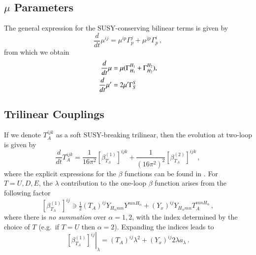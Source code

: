 \documentclass[final,3p,times,pdflatex]{elsarticle}
\newcommand{\dt}{\frac{d}{dt}}
\begin{document}
\subsection{$\mu$ Parameters}
The general expression \cite{MV94,Yam94} for the SUSY-conserving bilinear terms is given by  
%
\begin{equation}
\dt \mu^{ij} = \mu^{ip}\Gamma_p^j + \mu^{jp}\Gamma_p^i\,,
\end{equation}
%
from which we obtain
%
\begin{align}
\dt\mu &= \mu (\Gamma_{H_1}^{H_1} + \Gamma_{H_2}^{H_2}), \notag \\
%
\dt\mu' &= 2\mu' \Gamma_S^S
\end{align}
%

\subsection{Trilinear Couplings}
If we denote $T_A^{ijk}$ as a soft SUSY-breaking trilinear, then the evolution at two-loop is given by 
%
\begin{equation}
\dt T_A^{ijk} = \frac{1}{16\pi^2} \left[\beta_{T_A}^{(1)}\right]^{ijk} 
+ \frac{1}{(16\pi^2)^2} \left[\beta_{T_A}^{(2)}\right]^{ijk}\,,
\end{equation}
%
where the explicit expressions for the $\beta$ functions can be found in \cite{MV94}.  
For $T = U,D,E$, the $\lambda$ contribution to the one-loop $\beta$ function 
arises from the following factor
%
\begin{equation}
\left[\beta_{T_A}^{(1)}\right]^{ij} \ni \tfrac{1}{2} (T_A)^{ij} 
Y_{H_\alpha mn}Y^{mnH_\alpha} + (Y_x)^{ij} Y_{H_\alpha mn}T_A^{mnH_\alpha}\,,
\end{equation}
%
where there is {\it no summation} over $\alpha = 1,2$, with the index 
determined by the choice of $T$ (e.g.\ if $T=U$ then $\alpha = 2$). Expanding 
the indices leads to
%
\begin{equation}
\left.\left[\beta_{T_A}^{(1)}\right]^{ij}\right|_\lambda = (T_A)^{ij}\lambda^2 
+ (Y_x)^{ij} 2\lambda a_\lambda\,. \label{eqn: beta hx}
\end{equation}
%
\end{document}
